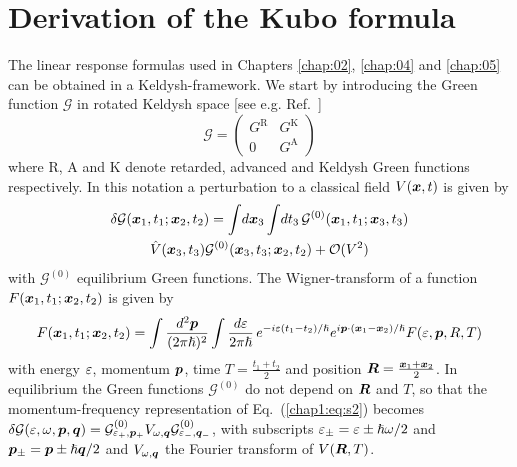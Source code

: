 \chapter{Derivation of the Kubo formula}\label{app:kubo}
The linear response formulas used in Chapters \ref{chap:02}, \ref{chap:04} and \ref{chap:05} can be obtained in a Keldysh-framework. We start by introducing the Green function $\mathcal{G}$ in rotated Keldysh space [see e.g. Ref.~\cite{rammer_quantum_1986}]
\begin{equation}
    \mathcal{G}=\begin{pmatrix}G^\text{R}&G^\text{K}\\0&G^\text{A}\end{pmatrix}
\end{equation}
where R, A and K denote retarded, advanced and Keldysh Green functions respectively. In this notation a perturbation to a classical field $V(\boldsymbol{x},t)$ is given by
\begin{multline}
    \delta\mathcal{G}(\boldsymbol{x}_1,t_1;\boldsymbol{x}_2,t_2)=\int\!d\boldsymbol{x}_3\int\!dt_3\, \mathcal{G}^{(0)}(\boldsymbol{x}_1,t_1;\boldsymbol{x}_3,t_3)\\\hat{V}(\boldsymbol{x}_3,t_3)\mathcal{G}^{(0)}(\boldsymbol{x}_3,t_3;\boldsymbol{x}_2,t_2)+\mathcal{O}(V^2)
    \label{chap1:eq:s2}
\end{multline}
with $\mathcal{G}^{(0)}$ equilibrium Green functions. The Wigner-transform of a function $F(\boldsymbol{x}_1,t_1;\boldsymbol{x}_2,t_2)$ is given by
  \begin{multline}
    F(\boldsymbol{x}_1,t_1;\boldsymbol{x}_2,t_2)=\int\frac{d^2\boldsymbol{p}}{(2\pi\hslash)^2}\int \frac{d\varepsilon}{2\pi\hslash}\,e^{-i\varepsilon(t_1-t_2)/\hslash}e^{i\boldsymbol{p}\cdot(\boldsymbol{x}_1-\boldsymbol{x}_2)/\hslash}F(\varepsilon,\boldsymbol{p},R,T)
   \end{multline}
with energy $\varepsilon$, momentum $\boldsymbol{p}$, time $T=\frac{t_1+t_2}{2}$ and position $\boldsymbol{R}=\frac{\boldsymbol{x}_1+\boldsymbol{x}_2}{2}$. In equilibrium the Green functions $\mathcal{G}^{(0)}$ do not depend on $\boldsymbol{R}$ and $T$, so that the momentum-frequency representation of Eq.~(\ref{chap1:eq:s2}) becomes 
   $\delta\mathcal{G}(\varepsilon,\omega,\boldsymbol{p},\boldsymbol{q})= \mathcal{G}^{(0)}_{\varepsilon_+,\boldsymbol{p}_+} V_{\omega,\boldsymbol{q}}\mathcal{G}^{{(0)}}_{\varepsilon_-,\boldsymbol{q}_-}$, 
with subscripts $\varepsilon_\pm=\varepsilon\pm\hslash\omega/2$ and $\boldsymbol{p}_\pm=\boldsymbol{p}\pm\hslash\boldsymbol{q}/2$ and $V_{\omega,\boldsymbol{q}}$ the Fourier transform of $V(\boldsymbol{R},T)$. 

